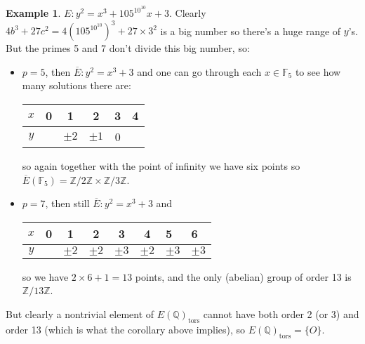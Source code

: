 \documentclass{article}
\newcommand{\F}{\mathbb{F}}
\newcommand{\Z}{\mathbb{Z}}
\newcommand{\Q}{\mathbb{Q}}
\theoremstyle{definition}
\newtheorem{example}[defn]{Example}
\begin{document}
\begin{example}
$E:y^2=x^3+105^{10^{10}}x+3$. Clearly $4b^3+27c^2=4\left(105^{10^{10}}\right)^3+27\times 3^2$ is a big number so there's a huge range of $y$'s. But the primes 5 and 7 don't divide this big number, so:
\begin{itemize}
\item $p=5$, then $\overline E:y^2=x^3+3$ and one can go through each $x\in\F_5$ to see how many solutions there are:

\begin{table}[h]
\centering
\begin{tabular}{c|ccccc}
$x$ & 0 & 1       & 2       & 3 & 4 \\ \hline
$y$ &   & $\pm 2$ & $\pm 1$ & 0 &  
\end{tabular}
\end{table}

so again together with the point of infinity we have six points so $\overline E(\F_5)=\Z/2\Z\times\Z/3\Z$.
\item $p=7$, then still $\overline E:y^2=x^3+3$ and

\begin{table}[h]
\centering
\begin{tabular}{c|cccccll}
$x$ & 0 & 1       & 2       & 3       & 4       & 5                           & 6                           \\ \hline
$y$ &   & $\pm 2$ & $\pm 2$ & $\pm 3$ & $\pm 2$ & \multicolumn{1}{c}{$\pm 3$} & \multicolumn{1}{c}{$\pm 3$}
\end{tabular}
\end{table}

so we have $2\times 6+1=13$ points, and the only (abelian) group of order 13 is $\Z/13\Z$.
\end{itemize}
But clearly a nontrivial element of $E(\Q)_{\operatorname{tors}}$ cannot have both order 2 (or 3) and order 13 (which is what the corollary above implies), so $E(\Q)_{\operatorname{tors}}=\{O\}$.
\end{example}
\end{document}
